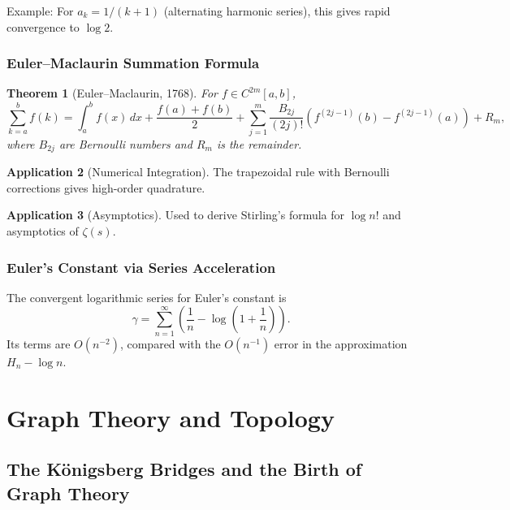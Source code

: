 \documentclass[11pt,a4paper,twoside]{book}
\theoremstyle{eulerstyle}
\newtheorem{theorem}{Theorem}[chapter]
\theoremstyle{definition}
\newtheorem{application}[theorem]{Application}
\begin{document}
Example: For $a_k = 1/(k+1)$ (alternating harmonic series), this gives rapid convergence to $\log 2$.

\section{Euler--Maclaurin Summation Formula}

\begin{theorem}[Euler--Maclaurin, 1768]
For $f \in C^{2m}[a,b]$,
\[
\sum_{k=a}^b f(k) = \int_a^b f(x)\,dx + \frac{f(a)+f(b)}{2} 
+ \sum_{j=1}^m \frac{B_{2j}}{(2j)!} \left( f^{(2j-1)}(b) - f^{(2j-1)}(a) \right) + R_m,
\]
where $B_{2j}$ are Bernoulli numbers and $R_m$ is the remainder.
\end{theorem}

\begin{application}[Numerical Integration]
The trapezoidal rule with Bernoulli corrections gives high-order quadrature.
\end{application}

\begin{application}[Asymptotics]
Used to derive Stirling's formula for $\log n!$ and asymptotics of $\zeta(s)$.
\end{application}

\section{Euler's Constant via Series Acceleration}

The convergent logarithmic series for Euler's constant is
\[
\gamma = \sum_{n=1}^\infty \left(\frac{1}{n} - \log\left(1+\frac{1}{n}\right)\right).
\]
Its terms are $O(n^{-2})$, compared with the $O(n^{-1})$ error in the
approximation $H_n-\log n$.

\cleardoublepage

\part{Graph Theory and Topology}
\label{part:graph_topology}

\chapter{The Königsberg Bridges and the Birth of Graph Theory}
\label{ch:konigsberg}
\end{document}
